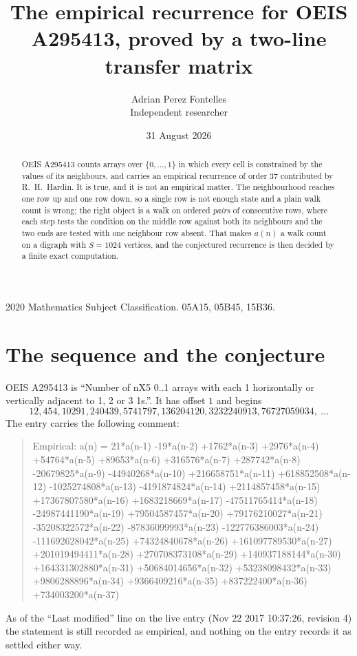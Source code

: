 \documentclass[11pt,a4paper]{article}
\title{The empirical recurrence for OEIS A295413, proved by a two-line transfer matrix}
\author{Adrian Perez Fontelles\\ \small Independent researcher}
\date{31 August 2026}
\theoremstyle{plain}
\theoremstyle{definition}
\begin{document}
\maketitle

\begin{abstract}
OEIS A295413 counts arrays over $\{0,\dots,1\}$ in which every cell is constrained by the
values of its neighbours, and carries an empirical recurrence of order $37$ contributed
by R.~H.~Hardin. It is true, and it is not an empirical matter. The neighbourhood reaches one
row up and one row down, so a single row is not enough state and a plain walk count
is wrong; the right object is a walk on ordered \emph{pairs} of consecutive rows, where
each step tests the condition on the middle row against both its neighbours and the two
ends are tested with one neighbour row absent. That makes $a(n)$ a walk count on a digraph
with $S=1024$ vertices, and the conjectured recurrence is then decided by a finite exact
computation.
\end{abstract}

\noindent\small 2020 Mathematics Subject Classification. 05A15, 05B45, 15B36.\normalsize

\section{The sequence and the conjecture}

OEIS A295413 is ``Number of nX5 0..1 arrays with each 1 horizontally or vertically adjacent to 1, 2 or 3 1s.''. It has offset $1$ and begins
\[
12, 454, 10291, 240439, 5741797, 136204120, 3232240913, 76727059034,\ \dots
\]
The entry carries the following comment:
\begin{quote}\small
Empirical: a(n) = 21*a(n-1) -19*a(n-2) +1762*a(n-3) +2976*a(n-4) +54764*a(n-5) +89653*a(n-6) +316576*a(n-7) +287742*a(n-8) -20679825*a(n-9) -44940268*a(n-10) +216658751*a(n-11) +618852508*a(n-12) -1025274808*a(n-13) -4191874824*a(n-14) +2114857458*a(n-15) +17367807580*a(n-16) +1683218669*a(n-17) -47511765414*a(n-18) -24987441190*a(n-19) +79504587457*a(n-20) +79176210027*a(n-21) -35208322572*a(n-22) -87836099993*a(n-23) -122776386003*a(n-24) -111692628042*a(n-25) +74324840678*a(n-26) +161097789530*a(n-27) +201019494411*a(n-28) +270708373108*a(n-29) +140937188144*a(n-30) +164331302880*a(n-31) +50684014656*a(n-32) +53238098432*a(n-33) +9806288896*a(n-34) +9366409216*a(n-35) +837222400*a(n-36) +734003200*a(n-37)
\end{quote}
As of the ``Last modified'' line on the live entry (Nov 22 2017 10:37:26, revision 4) the statement is
still recorded as empirical, and nothing on the entry records it as settled either way.
\end{document}
